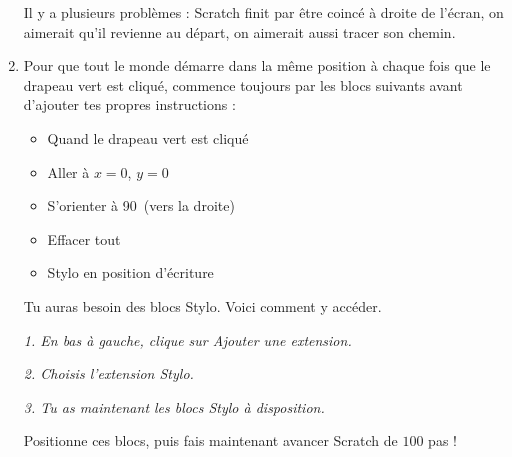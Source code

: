 \documentclass[class=report,crop=false, 12pt]{standalone}
\begin{document}
\begin{activite}
\begin{enumerate}
  Il y a plusieurs problèmes : Scratch finit par être coincé à droite de l'écran, on aimerait qu'il revienne au départ, on aimerait aussi tracer son chemin.
  
  
  \item Pour que tout le monde démarre dans la même position à chaque fois que le drapeau vert est cliqué, commence toujours par les blocs suivants avant d'ajouter tes propres instructions :
  
  \begin{itemize}
    \item Quand le drapeau vert est cliqué
    \item Aller à $x = 0$, $y = 0$
    \item S'orienter à 90\textdegree\ (vers la droite)
    \item Effacer tout
    \item Stylo en position d'écriture
  \end{itemize}  

\medskip

Tu auras besoin des blocs \og{}Stylo\fg{}. Voici comment y accéder.
\begin{center}
\small
\begin{minipage}{0.45\textwidth}
\center
{} 

\emph{1. En bas à gauche, clique sur \og{}Ajouter une extension\fg{}.}
\end{minipage}
\begin{minipage}{0.45\textwidth}
\center
{} 

\emph{2. Choisis l'extension \og{}Stylo\fg{}.}
\end{minipage}


\emph{3. Tu as maintenant les blocs \og{}Stylo\fg{} à disposition.}

\end{center}

Positionne ces blocs, puis fais maintenant avancer Scratch de $100$ pas ! 

\begin{center}
\begin{scratch}
\end{scratch}
\end{center} 
  


\end{enumerate}
\end{activite}
\end{document}
